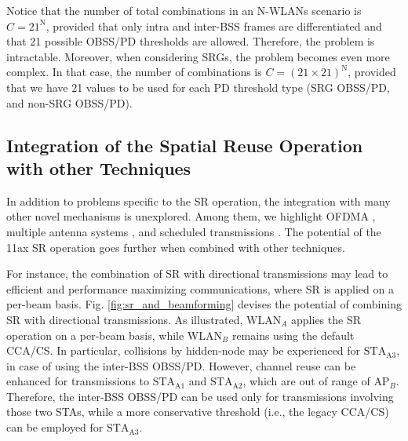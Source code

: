 \documentclass[comsoc]{IEEEtran}
\begin{document}
	Notice that the number of total combinations in an N-WLANs scenario is $C = 21^\text{N}$, provided that only intra and inter-BSS frames are differentiated and that 21 possible OBSS/PD thresholds are allowed. Therefore, the problem is intractable. Moreover, when considering SRGs, the problem becomes even more complex. In that case, the number of combinations is $C = (21\times21)^\text{N}$, provided that we have 21 values to be used for each PD threshold type (SRG OBSS/PD, and non-SRG OBSS/PD).
	
	\subsection{Integration of the Spatial Reuse Operation with other Techniques}
	
	In addition to problems specific to the SR operation, the integration with many other novel mechanisms is unexplored. Among them, we highlight OFDMA \cite{bankov2018ofdma, dovelos2018optimal}, multiple antenna systems \cite{liao2016mu}, and scheduled transmissions \cite{nurchis2019target}. The potential of the 11ax SR operation goes further when combined with other techniques. 
	
	For instance, the combination of SR with directional transmissions may lead to efficient and performance maximizing communications, where SR is applied on a per-beam basis. Fig. \ref{fig:sr_and_beamforming} devises the potential of combining SR with directional transmissions. As illustrated, $\text{WLAN}_A$ applies the SR operation on a per-beam basis, while $\text{WLAN}_B$ remains using the default CCA/CS. In particular, collisions by hidden-node may be experienced for $\text{STA}_\text{A3}$, in case of using the inter-BSS OBSS/PD. However, channel reuse can be enhanced for transmissions to $\text{STA}_\text{A1}$ and $\text{STA}_\text{A2}$, which are out of range of $\text{AP}_B$. Therefore, the inter-BSS OBSS/PD can be used only for transmissions involving those two STAs, while a more conservative threshold (i.e., the legacy CCA/CS) can be employed for $\text{STA}_\text{A3}$.
	
\end{document}
